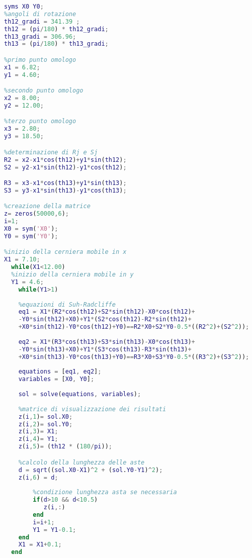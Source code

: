 \documentclass{article}
\begin{document}
\begin{lstlisting}[language=Matlab]
syms X0 Y0;
%angoli di rotazione
th12_gradi = 341.39 ;
th12 = (pi/180) * th12_gradi;
th13_gradi = 306.96;
th13 = (pi/180) * th13_gradi;

%primo punto omologo
x1 = 6.82;
y1 = 4.60;

%secondo punto omologo
x2 = 8.00;
y2 = 12.00;

%terzo punto omologo
x3 = 2.80;
y3 = 18.50;

%determinazione di Rj e Sj
R2 = x2-x1*cos(th12)+y1*sin(th12);
S2 = y2-x1*sin(th12)-y1*cos(th12);

R3 = x3-x1*cos(th13)+y1*sin(th13);
S3 = y3-x1*sin(th13)-y1*cos(th13);

%creazione della matrice
z= zeros(50000,6);
i=1;
X0 = sym('X0');
Y0 = sym('Y0');

%inizio della cerniera mobile in x
X1 = 7.10;
  while(X1<12.00)
  %inizio della cerniera mobile in y
  Y1 = 4.6;
    while(Y1>1)
        
    %equazioni di Suh-Radcliffe
    eq1 = X1*(R2*cos(th12)+S2*sin(th12)-X0*cos(th12)+
    -Y0*sin(th12)+X0)+Y1*(S2*cos(th12)-R2*sin(th12)+
    +X0*sin(th12)-Y0*cos(th12)+Y0)==R2*X0+S2*Y0-0.5*((R2^2)+(S2^2));
    
    eq2 = X1*(R3*cos(th13)+S3*sin(th13)-X0*cos(th13)+
    -Y0*sin(th13)+X0)+Y1*(S3*cos(th13)-R3*sin(th13)+
    +X0*sin(th13)-Y0*cos(th13)+Y0)==R3*X0+S3*Y0-0.5*((R3^2)+(S3^2));
        
    equations = [eq1, eq2];
    variables = [X0, Y0];
    
    sol = solve(equations, variables);
                
    %matrice di visualizzazione dei risultati
    z(i,1)= sol.X0;
    z(i,2)= sol.Y0;
    z(i,3)= X1;
    z(i,4)= Y1;
    z(i,5)= (th12 * (180/pi));

    %calcolo della lunghezza delle aste
    d = sqrt((sol.X0-X1)^2 + (sol.Y0-Y1)^2);
    z(i,6) = d;
               
        %condizione lunghezza asta se necessaria
        if(d>10 && d<10.5)
           z(i,:)
        end          
        i=i+1;
        Y1 = Y1-0.1;
    end
    X1 = X1+0.1;
  end

\end{lstlisting}
\end{document}
